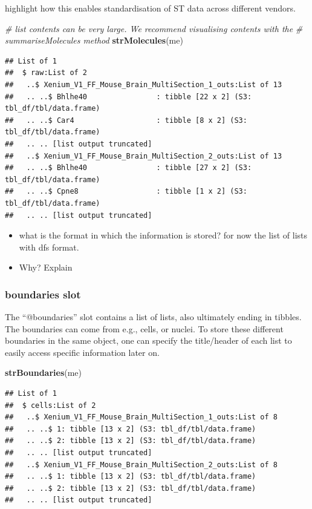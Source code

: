 \documentclass[
]{article}
\newenvironment{Shaded}{\begin{snugshade}}{\end{snugshade}}
\newcommand{\CommentTok}[1]{\textcolor[rgb]{0.56,0.35,0.01}{\textit{#1}}}
\newcommand{\KeywordTok}[1]{\textcolor[rgb]{0.13,0.29,0.53}{\textbf{#1}}}
\newcommand{\NormalTok}[1]{#1}
\providecommand{\tightlist}{%
  \setlength{\itemsep}{0pt}\setlength{\parskip}{0pt}}
\begin{document}
highlight how this enables standardisation of ST data across different
vendors.

\begin{Shaded}
\begin{Highlighting}[]
\CommentTok{\# list contents can be very large. We recommend visualising contents with the}
\CommentTok{\# summariseMolecules method}
\KeywordTok{strMolecules}\NormalTok{(me)}
\end{Highlighting}
\end{Shaded}

\begin{verbatim}
## List of 1
##  $ raw:List of 2
##   ..$ Xenium_V1_FF_Mouse_Brain_MultiSection_1_outs:List of 13
##   .. ..$ Bhlhe40                : tibble [22 x 2] (S3: tbl_df/tbl/data.frame)
##   .. ..$ Car4                   : tibble [8 x 2] (S3: tbl_df/tbl/data.frame)
##   .. .. [list output truncated]
##   ..$ Xenium_V1_FF_Mouse_Brain_MultiSection_2_outs:List of 13
##   .. ..$ Bhlhe40                : tibble [27 x 2] (S3: tbl_df/tbl/data.frame)
##   .. ..$ Cpne8                  : tibble [1 x 2] (S3: tbl_df/tbl/data.frame)
##   .. .. [list output truncated]
\end{verbatim}

\begin{itemize}
\tightlist
\item
  what is the format in which the information is stored? for now the
  list of lists with dfs format.
\item
  Why? Explain
\end{itemize}

\hypertarget{boundaries-slot}{%
\subsubsection{boundaries slot}\label{boundaries-slot}}

The ``@boundaries'' slot contains a list of lists, also ultimately
ending in tibbles. The boundaries can come from e.g., cells, or nuclei.
To store these different boundaries in the same object, one can specify
the title/header of each list to easily access specific information
later on.

\begin{Shaded}
\begin{Highlighting}[]
\KeywordTok{strBoundaries}\NormalTok{(me)}
\end{Highlighting}
\end{Shaded}

\begin{verbatim}
## List of 1
##  $ cells:List of 2
##   ..$ Xenium_V1_FF_Mouse_Brain_MultiSection_1_outs:List of 8
##   .. ..$ 1: tibble [13 x 2] (S3: tbl_df/tbl/data.frame)
##   .. ..$ 2: tibble [13 x 2] (S3: tbl_df/tbl/data.frame)
##   .. .. [list output truncated]
##   ..$ Xenium_V1_FF_Mouse_Brain_MultiSection_2_outs:List of 8
##   .. ..$ 1: tibble [13 x 2] (S3: tbl_df/tbl/data.frame)
##   .. ..$ 2: tibble [13 x 2] (S3: tbl_df/tbl/data.frame)
##   .. .. [list output truncated]
\end{verbatim}
\end{document}
